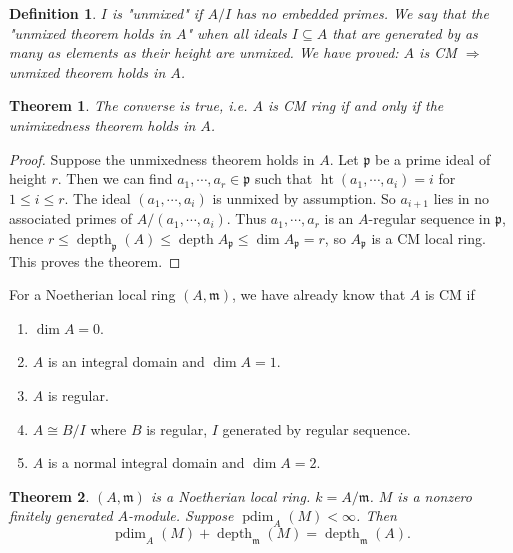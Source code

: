 \documentclass[cs4size]{article}
\newcommand{\su}{\subseteq}
\newcommand{\frm}{\mathfrak{m}}
\newcommand{\frp}{\mathfrak{p}}
\newcommand{\Ra}{\Rightarrow}
\DeclareMathOperator{\height}{ht}
\DeclareMathOperator{\depth}{depth}
\DeclareMathOperator{\pdim}{pdim}
\newtheorem{thm}{Theorem}
\newtheorem{definition}{Definition}
\begin{document}
\begin{definition}
$I$ is "unmixed" if $A/I$ has no embedded primes. We say that the "unmixed theorem holds in $A$" when all ideals $I\su A$ that are generated by as many as elements as their height are unmixed. We have proved: $A$ is CM $\Ra$ unmixed theorem holds in $A$.
\end{definition}

\begin{thm}
The converse is true, i.e. $A$ is CM ring if and only if the unimixedness theorem holds in $A$.
\end{thm}
\begin{proof}
Suppose the unmixedness theorem holds in $A$. Let $\frp$ be a prime ideal of height $r$. Then we can find $a_1,\cdots,a_r\in \frp$  such that $\height(a_1,\cdots,a_i)=i$ for $1\leq i\leq r$. The ideal $(a_1,\cdots,a_i)$ is unmixed by assumption. So $a_{i+1}$ lies in no associated primes of $A/(a_1,\cdots,a_i)$. Thus $a_1,\cdots,a_r$ is an $A$-regular sequence in $\frp$, hence $r\leq \depth_\frp(A)\leq\depth A_\frp\leq \dim A_\frp=r$, so $A_\frp$ is a CM local ring. This proves the theorem.
\end{proof}

For a Noetherian local ring $(A,\frm)$, we have already know that $A$ is CM if
\begin{enumerate}
\item $\dim A=0$.
\item $A$ is an integral domain and $\dim A=1$.
\item $A$ is regular.
\item $A\cong B/I$ where $B$ is regular, $I$ generated by regular sequence.
\item $A$ is a normal integral domain and $\dim A=2$.
\end{enumerate}

\begin{thm}
$(A,\frm)$ is a Noetherian local ring. $k=A/\frm$. $M$ is a nonzero finitely generated $A$-module. Suppose $\pdim_A(M)<\infty$. Then
\[\pdim_A(M)+\depth_\frm(M)=\depth_\frm(A).\]
\end{thm}
\end{document}

